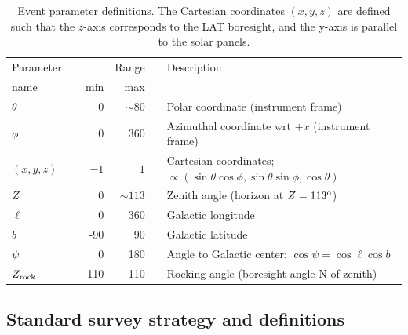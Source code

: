 \documentclass[aps,twocolumn,prd,superscriptaddress,showpacs,nofootinbib,fixfloat]{revtex4}
\newcommand{\degree}{^{\rm o}}
\newcommand{\zrock}{$Z_{\rm rock}$}
\begin{document}
\begin{table}
  \begin{center}
    \begin{tabular}{lcrrcl}
      \hline
      Parameter &\hphantom{i}& & Range &\hphantom{i}&  Description\\
      name      && min & max &&            \\
      \hline
      $\theta$ &&    0 &  $\sim80$ && Polar coordinate (instrument frame) \\
      $\phi$   &&    0 &       360 && Azimuthal coordinate wrt $+x$ (instrument frame) \\
      $(x,y,z)$&&  $-1$& $1$ && Cartesian coordinates;
      $\propto(\sin\theta\cos\phi, \sin\theta\sin\phi, \cos\theta)$\\
      $Z$      &&    0 & $\sim113$ && Zenith angle (horizon at $Z=113\degree$) \\
      $\ell$   &&    0 & 360 && Galactic longitude \\
      $b$      &&  -90 &  90 && Galactic latitude \\
      $\psi$   &&    0 & 180 && Angle to Galactic center; $\cos\psi=\cos\ell\cos b$ \\
      \zrock\  && -110 & 110 && Rocking angle (boresight angle N of zenith) \\
      \hline
    \end{tabular}
    \caption{Event parameter definitions. The Cartesian coordinates $(x, y, z)$ are
    defined such that the $z$-axis corresponds to the LAT boresight, and the
    y-axis is parallel to the solar panels.}
    \label{tab:parameters}
  \end{center}
\end{table}

\subsection{Standard survey strategy and definitions}
\label{sec:conventions}





\end{document}
